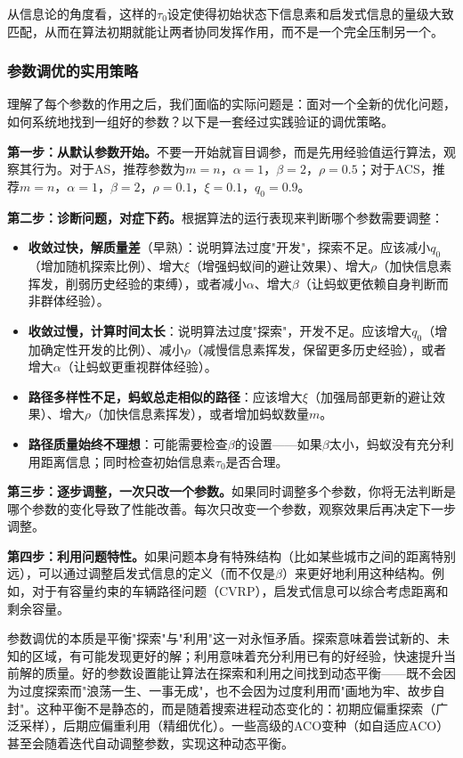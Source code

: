 \documentclass[lang=cn,zihao=-4,a4paper,fontset=windows]{beautybook}
\begin{document}
从信息论的角度看，这样的$\tau_0$设定使得初始状态下信息素和启发式信息的量级大致匹配，从而在算法初期就能让两者协同发挥作用，而不是一个完全压制另一个。

\subsubsection{参数调优的实用策略}

理解了每个参数的作用之后，我们面临的实际问题是：面对一个全新的优化问题，如何系统地找到一组好的参数？以下是一套经过实践验证的调优策略。

\textbf{第一步：从默认参数开始。}不要一开始就盲目调参，而是先用经验值运行算法，观察其行为。对于AS，推荐参数为$m=n$，$\alpha=1$，$\beta=2$，$\rho=0.5$；对于ACS，推荐$m=n$，$\alpha=1$，$\beta=2$，$\rho=0.1$，$\xi=0.1$，$q_0=0.9$。

\textbf{第二步：诊断问题，对症下药。}根据算法的运行表现来判断哪个参数需要调整：
\begin{itemize}
    \item \textbf{收敛过快，解质量差}（早熟）：说明算法过度"开发"，探索不足。应该减小$q_0$（增加随机探索比例）、增大$\xi$（增强蚂蚁间的避让效果）、增大$\rho$（加快信息素挥发，削弱历史经验的束缚），或者减小$\alpha$、增大$\beta$（让蚂蚁更依赖自身判断而非群体经验）。
    \item \textbf{收敛过慢，计算时间太长}：说明算法过度"探索"，开发不足。应该增大$q_0$（增加确定性开发的比例）、减小$\rho$（减慢信息素挥发，保留更多历史经验），或者增大$\alpha$（让蚂蚁更重视群体经验）。
    \item \textbf{路径多样性不足，蚂蚁总走相似的路径}：应该增大$\xi$（加强局部更新的避让效果）、增大$\rho$（加快信息素挥发），或者增加蚂蚁数量$m$。
    \item \textbf{路径质量始终不理想}：可能需要检查$\beta$的设置——如果$\beta$太小，蚂蚁没有充分利用距离信息；同时检查初始信息素$\tau_0$是否合理。
\end{itemize}

\textbf{第三步：逐步调整，一次只改一个参数。}如果同时调整多个参数，你将无法判断是哪个参数的变化导致了性能改善。每次只改变一个参数，观察效果后再决定下一步调整。

\textbf{第四步：利用问题特性。}如果问题本身有特殊结构（比如某些城市之间的距离特别远），可以通过调整启发式信息的定义（而不仅是$\beta$）来更好地利用这种结构。例如，对于有容量约束的车辆路径问题（CVRP），启发式信息可以综合考虑距离和剩余容量。

\begin{fancybox}
参数调优的本质是平衡"探索"与"利用"这一对永恒矛盾。探索意味着尝试新的、未知的区域，有可能发现更好的解；利用意味着充分利用已有的好经验，快速提升当前解的质量。好的参数设置能让算法在探索和利用之间找到动态平衡——既不会因为过度探索而"浪荡一生、一事无成"，也不会因为过度利用而"画地为牢、故步自封"。这种平衡不是静态的，而是随着搜索进程动态变化的：初期应偏重探索（广泛采样），后期应偏重利用（精细优化）。一些高级的ACO变种（如自适应ACO）甚至会随着迭代自动调整参数，实现这种动态平衡。
\end{fancybox}
\end{document}
